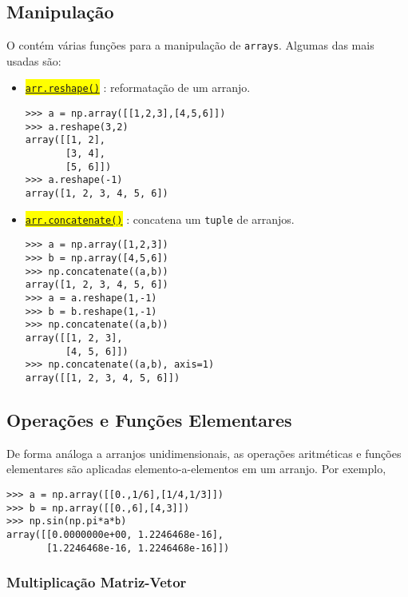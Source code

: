 \subsection{Manipulação}

O {\numpy} contém várias funções para a manipulação de \lstinline+arrays+. Algumas das mais usadas são:
\begin{itemize}
\item \hl{{\href{https://numpy.org/doc/stable/reference/generated/numpy.reshape.html\#numpy.reshape}{\lstinline+arr.reshape()+}}} : reformatação de um arranjo.
\begin{lstlisting}
>>> a = np.array([[1,2,3],[4,5,6]])
>>> a.reshape(3,2)
array([[1, 2],
       [3, 4],
       [5, 6]])
>>> a.reshape(-1)
array([1, 2, 3, 4, 5, 6])
\end{lstlisting}
\item \hl{{\href{https://numpy.org/doc/stable/reference/generated/numpy.concatenate.html}{\lstinline+arr.concatenate()+}}} : concatena um \lstinline+tuple+ de arranjos.
\begin{lstlisting}
>>> a = np.array([1,2,3])
>>> b = np.array([4,5,6])
>>> np.concatenate((a,b))
array([1, 2, 3, 4, 5, 6])
>>> a = a.reshape(1,-1)
>>> b = b.reshape(1,-1)
>>> np.concatenate((a,b))
array([[1, 2, 3],
       [4, 5, 6]])
>>> np.concatenate((a,b), axis=1)
array([[1, 2, 3, 4, 5, 6]])
\end{lstlisting}
\end{itemize}

\subsection{Operações e Funções Elementares}

De forma análoga a arranjos unidimensionais, as operações aritméticas e funções elementares são aplicadas elemento-a-elementos em um arranjo. Por exemplo,
\begin{lstlisting}
>>> a = np.array([[0.,1/6],[1/4,1/3]])
>>> b = np.array([[0.,6],[4,3]])
>>> np.sin(np.pi*a*b)
array([[0.0000000e+00, 1.2246468e-16],
       [1.2246468e-16, 1.2246468e-16]])
\end{lstlisting}

\subsubsection{Multiplicação Matriz-Vetor}

